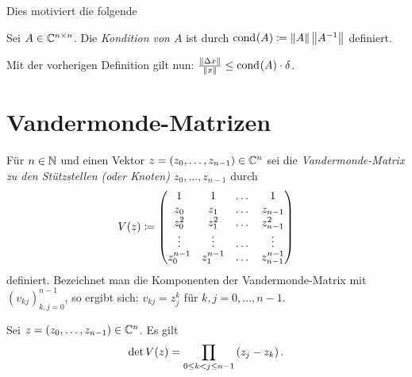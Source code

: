 \noindent Dies motiviert die folgende
\begin{mydef}
    Sei $A \in \mathbb{C}^{n \times n}$.
    Die \emph{Kondition von $A$} ist durch
    $\text{cond}_{{}}\! \left( A \right) \coloneqq \left\lVert A \right\rVert \left\lVert A^{-1} \right\rVert$
    definiert.
\end{mydef}

\begin{remark}
    Mit der vorherigen Definition gilt nun: $ \frac{\left\lVert \Delta x \right\rVert}{\left\lVert x \right\rVert} \leq \text{cond}_{{}}\! \left( A \right) \cdot \delta $.
\end{remark}

\section{Vandermonde-Matrizen}

\begin{mydef}
    Für $n \in \mathbb{N}$ und einen Vektor ${z = (z_0, \dots, z_{n-1}) \in \mathbb{C}^n}$
    sei die
    \emph{Vandermonde-Matrix zu den Stützstellen (oder Knoten) $z_0, \dots, z_{n-1}$}
    durch
    \[
        V \! \left( z \right) \coloneqq \begin{pmatrix}
            1         & 1         & \dots & 1 \\
            z_0       & z_1       & \dots & z_{n-1} \\
            z_0^2     & z_1^2     & \dots & z_{n-1}^2 \\
            \vdots    & \vdots    & \dots & \vdots \\
            z_0^{n-1} & z_1^{n-1} & \dots & z_{n-1}^{n-1}
        \end{pmatrix}
    \]
    definiert.
    Bezeichnet man die Komponenten der Vandermonde-Matrix mit
    $\left( v_{kj} \right)_{k,j = 0}^{n-1}$, so ergibt sich:
    $ v_{kj} = z_j^k $ für $k, j = 0, \dots, n-1$.

\end{mydef}

\begin{lemma}
    Sei $z = (z_0, \dots, z_{n-1}) \in \mathbb{C}^n$.
    Es gilt
    \[
        \det V \! \left( z \right) = \prod_{0 \leq k < j \leq n-1} \left( z_j - z_k \right).
    \]
\end{lemma}

